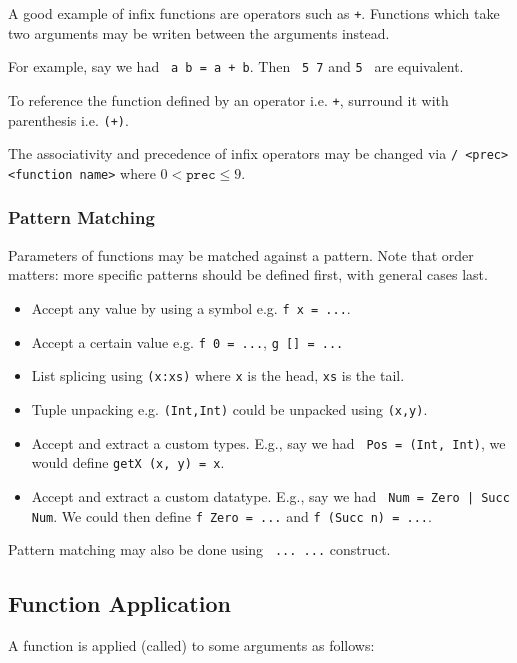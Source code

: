 A good example of infix functions are operators such as \texttt{+}. Functions which take two arguments may be writen between the arguments instead.

For example, say we had \texttt{ a b = a + b}. Then \texttt{ 5 7} and \texttt{5 \;\textasciigrave{}\textasciigrave{}} are equivalent.

To reference the function defined by an operator i.e. \texttt{+}, surround it with parenthesis i.e. \texttt{(+)}.

The associativity and precedence of infix operators may be changed via \texttt{/ <prec> <function name>} where $0 < \texttt{prec} \le 9$.

\subsubsection{Pattern Matching}

Parameters of functions may be matched against a pattern. Note that order matters: more specific patterns should be defined first, with general cases last.
\begin{itemize}
  \item Accept any value by using a symbol e.g. \texttt{f x = ...}.
  \item Accept a certain value e.g. \texttt{f 0 = ...}, \texttt{g [] = ...}
  \item List splicing using \texttt{(x:xs)} where \texttt{x} is the head, \texttt{xs} is the tail.
  \item Tuple unpacking e.g. \texttt{(Int,Int)} could be unpacked using \texttt{(x,y)}.
  \item Accept and extract a custom types. E.g., say we had \texttt{ Pos = (Int, Int)}, we would define \texttt{getX (x, y) = x}.
  \item Accept and extract a custom datatype. E.g., say we had \texttt{ Num = Zero | Succ Num}. We could then define \texttt{f Zero = ...} and \texttt{f (Succ n) = ...}.
\end{itemize}

Pattern matching may also be done using \texttt{ ...  ...} construct.

\subsection{Function Application}

A function is applied (called) to some arguments as follows:

